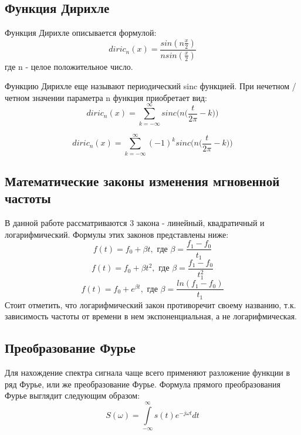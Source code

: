\subsection{Функция Дирихле}
Функция Дирихле описывается формулой:
\begin{equation}
	diric_n(x) = \frac{sin(n\frac{x}{2})}{n sin(\frac{x}{2})}
\end{equation}
где n - целое положительное число.

Функцию Дирихле еще называют периодический sinc функцией.
При нечетном / четном значении параметра n функция приобретает вид:
\begin{equation}
	diric_n(x) = \sum \limits_{k = -\infty}^{\infty} sinc \bigg( n \bigg( \frac{t}{2\pi} - k \bigg) \bigg)
\end{equation}

\begin{equation}
	diric_n(x) = \sum \limits_{k = -\infty}^{\infty} (-1)^k sinc \bigg( n \bigg( \frac{t}{2\pi} - k \bigg) \bigg)
\end{equation}

\subsection{Математические законы изменения мгновенной частоты}
В данной работе рассматриваются 3 закона - линейный, квадратичный и логарифмический. Формулы этих законов представлены ниже:
\begin{equation}
	f(t) = f_0 + \beta t, \text{ где } \beta = \frac{f_1 - f_0}{t_1}
\end{equation}
\begin{equation}
	f(t) = f_0 + \beta t^2, \text{ где } \beta = \frac{f_1 - f_0}{t_1^2}
\end{equation}
\begin{equation}
	f(t) = f_0 + e^{\beta t}, \text{ где } \beta = \frac{ln(f_1 - f_0)}{t_1}
\end{equation}
Стоит отметить, что логарифмический закон противоречит своему названию, т.к. зависимость частоты от времени в нем экспоненциальная, а не логарифмическая.

\subsection{Преобразование Фурье}
Для нахождение спектра сигнала чаще всего применяют разложение функции в ряд Фурье, или же преобразование Фурье.
Формула прямого преобразования Фурье выглядит следующим образом:
\begin{equation}
	S(\omega) = \int \limits_{-\infty}^{\infty} s(t)e^{-j\omega t} dt
\end{equation}

